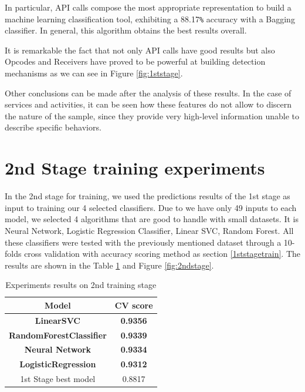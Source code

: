  In particular, API
calls compose the most appropriate representation to build a machine learning classification
tool, exhibiting a 88.17\verb+%+ accuracy with a Bagging classifier. In general,
this algorithm obtains the best results overall.

It is remarkable the fact that not only API calls have good results but also Opcodes and Receivers have proved to be powerful at building detection mechanisms as we can see in Figure \ref{fig:1ststage}. 

Other conclusions can be made after the analysis of these results. In the case of services and activities, it can be seen how these features do not allow to discern the nature of the
sample, since they provide very high-level information unable to describe specific behaviors.

\section{2nd Stage training experiments}

In the 2nd stage for training, we used the predictions results of the 1st stage as input to training our 4 selected classifiers. Due to we have only 49 inputs to each model, we selected 4 algorithms that are good to handle with small datasets. It is Neural Network, Logistic Regression Classifier, Linear SVC, Random Forest.
All these classifiers were tested with the previously mentioned dataset through a 10-folds cross validation with accuracy scoring method as section \ref{1ststagetrain}.
The results are shown in the Table \ref{table:2ndstage} and Figure \ref{fig:2ndstage}.


\begin{table}[htbp]
    \centering
    \caption{Experiments results on 2nd training stage}
    \label{table:2ndstage}
        
        \begin{tabular}{|cc|}
            \hline
            
            \textbf{Model} & \textbf{CV score} \\ \hline
            \textbf{LinearSVC} & \textbf{0.9356} \\ \hline
            \textbf{RandomForestClassifier} & \textbf{0.9339} \\ \hline
            \textbf{Neural Network} & \textbf{0.9334} \\ \hline
            \textbf{LogisticRegression} & \textbf{0.9312} \\ \hline
            1st Stage best model & 0.8817 \\ \hline
            
            \end{tabular}
    \end{table}


